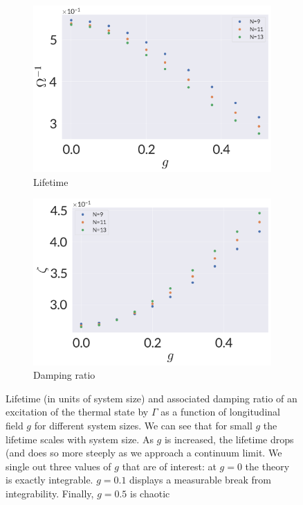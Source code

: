 \begin{figure}
	\centering
\begin{subfigure}{0.5\textwidth}
	\centering
\includegraphics[width=\columnwidth]{figures/chapter1/lifetime.png}
\caption{Lifetime}
\end{subfigure}%
\begin{subfigure}{0.5\textwidth}
	\centering
\includegraphics[width=\columnwidth]{figures/chapter1/damping.png}
\caption{Damping ratio}
\end{subfigure}
\caption{Lifetime (in units of system size) and associated damping ratio of an excitation of the thermal state by $\Gamma$ as a function of longitudinal field $g$ for different system sizes. We can see that for small $g$ the lifetime scales with system size. As $g$ is increased, the lifetime drops (and does so more steeply as we approach a continuum limit. We single out three values of $g$ that are of interest: at $g=0$ the theory is exactly integrable. $g=0.1$ displays a measurable break from integrability. Finally, $g=0.5$ is chaotic}
\label{fig:life-damp}
\end{figure}

